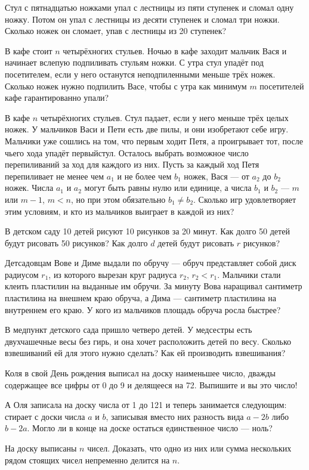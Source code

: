 \begin{itemize}
\itA Стул с пятнадцатью ножками упал с лестницы из пяти ступенек и сломал одну ножку. Потом он упал с лестницы из десяти ступенек и сломал три ножки. Сколько ножек он сломает, упав с лестницы из 20 ступенек?

\itB В кафе стоит $n$ четырёхногих стульев. Ночью в кафе заходит мальчик Вася и начинает вслепую подпиливать стульям ножки. С утра стул упадёт под посетителем, если у него останутся неподпиленными меньше трёх ножек. Сколько ножек нужно подпилить Васе, чтобы с утра как минимум $m$ посетителей кафе гарантированно упали?

\itC В кафе $n$ четырёхногих стульев. Стул падает, если у него меньше трёх целых ножек. У мальчиков Васи и Пети есть две пилы, и они изобретают себе игру. Мальчики уже сошлись на том, что первым ходит Петя, а проигрывает тот, после чьего хода упадёт первый\linebreak стул. Осталось выбрать возможное число перепиливаний за ход для каждого из них. Пусть за каждый ход Петя перепиливает не менее чем $a_1$ и не более чем $b_1$ ножек, Вася — от $a_2$ до $b_2$ ножек. Числа $a_1$ и $a_2$ могут быть равны нулю или единице, а числа $b_1$ и $b_2$ — $m$ или $m-1$, $m<n$, но при этом обязательно $b_1 \ne b_2$. Сколько игр удовлетворяет этим условиям, и кто из мальчиков выиграет в каждой из них?
\end{itemize}

\begin{itemize}
\itA В детском саду 10 детей рисуют 10 рисунков за 20 минут. Как долго 50 детей будут рисовать 50 рисунков? Как долго $d$ детей будут рисовать $r$ рисунков?

\itB Детсадовцам Вове и Диме выдали по обручу — обруч представляет собой диск радиусом $r_1$, из которого вырезан круг радиуса $r_2$, $r_2<r_1$. Мальчики стали клеить пластилин на выданные им обручи. За минуту Вова наращивал сантиметр пластилина на внешнем краю обруча, а Дима — сантиметр пластилина на внутреннем его краю. У кого из мальчиков площадь обруча росла быстрее?

\itC В медпункт детского сада пришло четверо детей. У медсестры есть двухчашечные весы без гирь, и она хочет расположить детей по весу. Сколько взвешиваний ей для этого нужно сделать? Как ей производить взвешивания?
\end{itemize}

\begin{itemize}
\itA Коля в свой День рождения выписал на доску наименьшее число, дважды содержащее все цифры от 0 до 9 и делящееся на 72. Выпишите и вы это число!

\itB А Оля записала на доску числа от 1 до 121 и теперь занимается следующим: стирает с доски числа $a$ и $b$, записывая вместо них разность вида $a-2b$ либо $b-2a$. Могло ли в конце на доске остаться единственное число — ноль?

\itC На доску выписаны $n$ чисел. Доказать, что одно из них или сумма нескольких рядом стоящих чисел непременно делится на $n$.
\end{itemize}

